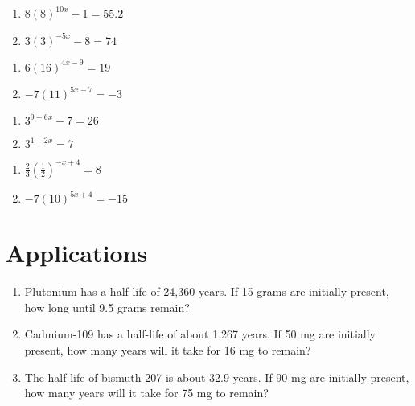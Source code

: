 \begin{multicols}{2}
\begin{enumerate}	\setcounter{enumi}{\value{Review}}
	\item $8(8)^{10x}-1 = 55.2$
	\item $3(3)^{-5x}-8=74$
\end{enumerate} \setcounter{Review}{\value{enumi}}
\end{multicols}
\begin{multicols}{2}
\begin{enumerate}	\setcounter{enumi}{\value{Review}}
	\item $6(16)^{4x-9} = 19$
	\item $-7(11)^{5x-7}=-3$
\end{enumerate} \setcounter{Review}{\value{enumi}}
\end{multicols}
\begin{multicols}{2}
\begin{enumerate}	\setcounter{enumi}{\value{Review}}
	\item $3^{9-6x}-7 = 26$
	\item $3^{1-2x} = 7$
\end{enumerate}		\setcounter{Review}{\value{enumi}}
\end{multicols}
\begin{multicols}{2}
\begin{enumerate}	\setcounter{enumi}{\value{Review}}
	\item $\frac{2}{3}\left(\frac{1}{2}\right)^{-x+4} = 8$
	\item $-7(10)^{5x+4} = -15$
\end{enumerate}		\setcounter{Review}{\value{enumi}}
\end{multicols}

\section{Applications}
\begin{enumerate}
	\item Plutonium has a half-life of 24,360 years. If 15 grams are initially present, how long until 9.5 grams remain?
	\item Cadmium-109 has a half-life of about 1.267 years. If 50 mg are initially present, how many years will it take for 16 mg to remain?
    \item The half-life of bismuth-207 is about 32.9 years. If 90 mg are initially present, how many years will it take for 75 mg to remain?
\end{enumerate}

